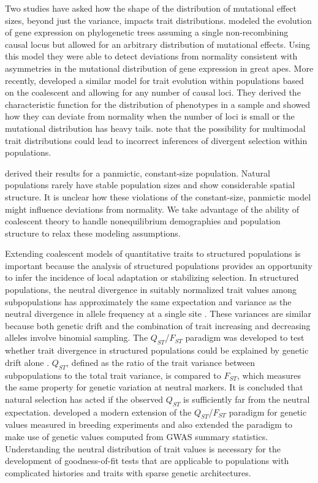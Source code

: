 Two studies have asked how the shape of the distribution of mutational effect
sizes, beyond just the variance, impacts trait
distributions. \citet{Khaitovich2005} modeled the evolution of gene expression
on phylogenetic trees assuming a single non-recombining causal locus but allowed
for an arbitrary distribution of mutational effects. Using this model they were
able to detect deviations from normality consistent with asymmetries in the
mutational distribution of gene expression in great apes. More
recently, \citet{Schraiber2015} developed a similar model for trait evolution
within populations based on the coalescent and allowing for any number of causal
loci. They derived the characteristic function for the distribution of
phenotypes in a sample and showed how they can deviate from normality when the
number of loci is small or the mutational distribution has heavy
tails. \citet{Schraiber2015} note that the possibility for multimodal trait
distributions could lead to incorrect inferences of divergent selection within
populations.

\citet{Schraiber2015} derived their results for a panmictic, constant-size
population. Natural populations rarely have stable population sizes and show
considerable spatial structure. It is unclear how these violations of the
constant-size, panmictic model might influence deviations from normality. We
take advantage of the ability of coalescent theory to handle nonequilibrium
demographies and population structure to relax these modeling assumptions.

Extending coalescent models of quantitative traits to structured populations is
important because the analysis of structured populations provides an opportunity
to infer the incidence of local adaptation or stabilizing selection. In
structured populations, the neutral divergence in suitably normalized trait
values among subpopulations has approximately the same expectation and variance
as the neutral divergence in allele frequency at a single
site \citep{Rogers1983,Whitlock2008}. These variances are similar because both
genetic drift and the combination of trait increasing and decreasing alleles
involve binomial sampling. The $Q_{ST}$/$F_{ST}$ paradigm was developed to test
whether trait divergence in structured populations could be explained by genetic
drift alone \citep{Spitze1993,Whitlock2008,Leinonen2013}. $Q_{ST}$, defined as
the ratio of the trait variance between subpopulations to the total trait
variance, is compared to $F_{ST}$, which measures the same property for genetic
variation at neutral markers. It is concluded that natural selection has acted
if the observed $Q_{ST}$ is sufficiently far from the neutral
expectation. \citet{Ovaskainen2011} developed a modern extension of the
$Q_{ST}$/$F_{ST}$ paradigm for genetic values measured in breeding experiments
and \citet{Berg2014} also extended the paradigm to make use of genetic values
computed from GWAS summary statistics. Understanding the neutral distribution of
trait values is necessary for the development of goodness-of-fit tests that are
applicable to populations with complicated histories and traits with sparse
genetic architectures.

